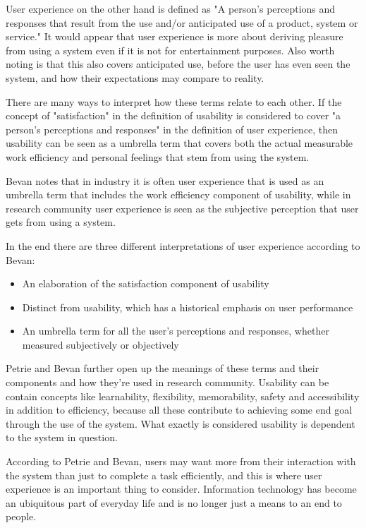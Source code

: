 User experience on the other hand is defined as "A person's perceptions and responses that result from the use and/or anticipated use of a product, system or service." It would appear that user experience is more about deriving pleasure from using a system even if it is not for entertainment purposes. Also worth noting is that this also covers anticipated use, before the user has even seen the system, and how their expectations may compare to reality.

There are many ways to interpret how these terms relate to each other. If the concept of "satisfaction" in the definition of usability is considered to cover "a person's perceptions and responses" in the definition of user experience, then usability can be seen as a umbrella term that covers both the actual measurable work efficiency and personal feelings that stem from using the system.

Bevan notes that in industry it is often user experience that is used as an umbrella term that includes the work efficiency component of usability, while in research community user experience is seen as the subjective perception that user gets from using a system.

In the end there are three different interpretations of user experience according to Bevan: \begin{itemize}
\item An  elaboration  of  the  satisfaction  component  of usability
\item Distinct  from  usability,  which  has  a  historical emphasis on user performance
\item An  umbrella  term  for  all  the  user’s  perceptions  and responses,  whether  measured  subjectively  or objectively
\end{itemize}
\cite{bevan2009difference}

Petrie and Bevan further open up the meanings of these terms and their components and how they're used in research community. Usability can be contain concepts like learnability, flexibility, memorability, safety and accessibility in addition to efficiency, because all these contribute to achieving some end goal through the use of the system. What exactly is considered usability is dependent to the system in question. 

According to Petrie and Bevan, users may want more from their interaction with the system than just to complete a task efficiently, and this is where user experience is an important thing to consider. Information technology has become an ubiquitous part of everyday life and is no longer just a means to an end to people.
\cite{bevanevaluation}

